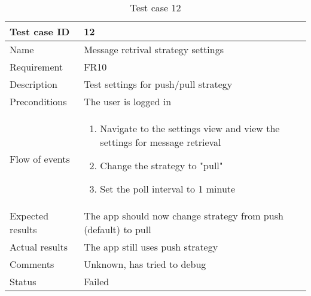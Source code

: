 		\begin{table}[htb]
			\begin{tabular}{l|p{10cm}}
				Test case ID & 12\\ \hline
				Name & Message retrival strategy settings\\ \hline
				Requirement & FR10\\ \hline
				Description & Test settings for push/pull strategy\\ \hline
				Preconditions & The user is logged in\\ \hline
				Flow of events & 
					\begin{enumerate}
						\item{}Navigate to the settings view and view the settings for message retrieval
						\item{}Change the strategy to "pull"
						\item{}Set the poll interval to 1 minute
					\end{enumerate} \\ \hline
				Expected results & The app should now change strategy from push (default) to pull \\ \hline
				Actual results & The app still uses push strategy\\ \hline
				Comments & Unknown, has tried to debug\\ \hline
				Status & Failed\\ \hline
			\end{tabular}
			\caption{Test case 12} \label{tab:case12}
		\end{table}

